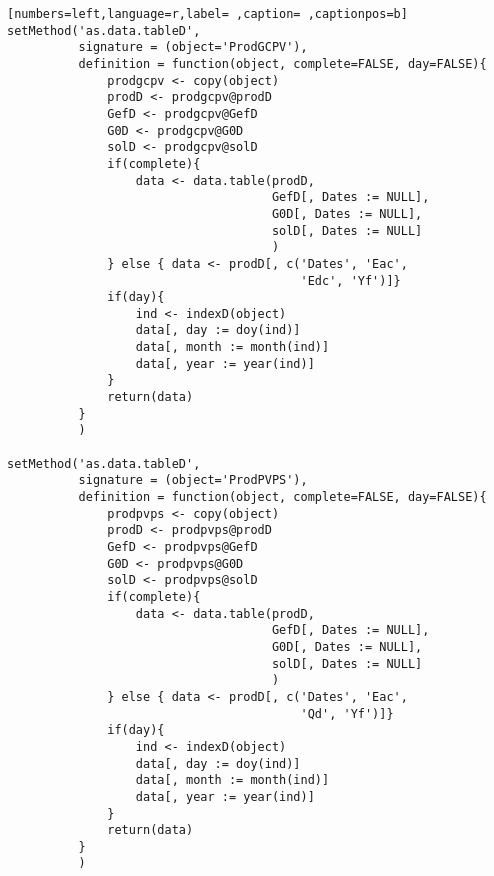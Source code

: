\begin{lstlisting}[numbers=left,language=r,label= ,caption= ,captionpos=b]
setMethod('as.data.tableD',
          signature = (object='ProdGCPV'),
          definition = function(object, complete=FALSE, day=FALSE){
              prodgcpv <- copy(object)
              prodD <- prodgcpv@prodD
              GefD <- prodgcpv@GefD
              G0D <- prodgcpv@G0D
              solD <- prodgcpv@solD
              if(complete){
                  data <- data.table(prodD,
                                     GefD[, Dates := NULL],
                                     G0D[, Dates := NULL],
                                     solD[, Dates := NULL]
                                     )
              } else { data <- prodD[, c('Dates', 'Eac',
                                         'Edc', 'Yf')]}
              if(day){
                  ind <- indexD(object)
                  data[, day := doy(ind)]
                  data[, month := month(ind)]
                  data[, year := year(ind)]
              }
              return(data)
          }
          )

setMethod('as.data.tableD',
          signature = (object='ProdPVPS'),
          definition = function(object, complete=FALSE, day=FALSE){
              prodpvps <- copy(object)
              prodD <- prodpvps@prodD
              GefD <- prodpvps@GefD
              G0D <- prodpvps@G0D
              solD <- prodpvps@solD
              if(complete){
                  data <- data.table(prodD,
                                     GefD[, Dates := NULL],
                                     G0D[, Dates := NULL],
                                     solD[, Dates := NULL]
                                     )
              } else { data <- prodD[, c('Dates', 'Eac',
                                         'Qd', 'Yf')]}
              if(day){
                  ind <- indexD(object)
                  data[, day := doy(ind)]
                  data[, month := month(ind)]
                  data[, year := year(ind)]
              }
              return(data)
          }
          )
\end{lstlisting}
